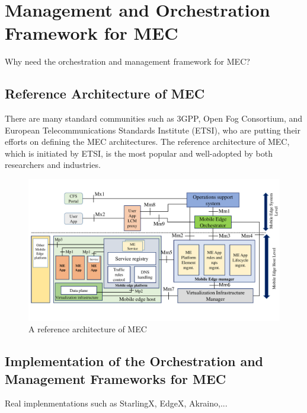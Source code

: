 \section{Management and Orchestration Framework for MEC} \label{framework}

Why need the orchestration and management framework for MEC?


\subsection{Reference Architecture of MEC}

There are many standard communities such as 3GPP, Open Fog Consortium, and European Telecommunications Standards Institute (ETSI), who are putting their efforts on defining the MEC architectures. 
The reference architecture of MEC, which is initiated by ETSI, is the most popular and well-adopted by both researchers and industries.


\begin{figure}[h!]
  \begin{center}
   \includegraphics[width=15cm]{./figures/book-etsi-mec.pdf}
   \caption{A reference architecture of MEC}
   \label{fig:etsi-mec}
   \end{center}
\end{figure}

\subsection{Implementation of the Orchestration and Management Frameworks for MEC}

Real implenmentations such as StarlingX, EdgeX, Akraino,... 

